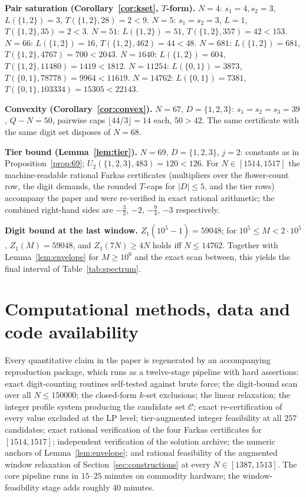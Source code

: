 \documentclass[11pt]{article}
\theoremstyle{definition}
\theoremstyle{remark}
\begin{document}
\medskip
\noindent\textbf{Pair saturation (Corollary~\ref{cor:kset}, $T$-form).} $N=4$: $s_1=4,s_2=3$, $L(\{1,2\})=3$, $T(\{1,2\},28)=2<9$. $N=5$: $s_1=s_2=3$, $L=1$, $T(\{1,2\},35)=2<3$. $N=51$: $L(\{1,2\})=51$, $T(\{1,2\},357)=42<153$. $N=66$: $L(\{1,2\})=16$, $T(\{1,2\},462)=44<48$. $N=681$: $L(\{1,2\})=681$, $T(\{1,2\},4767)=700<2043$. $N=1640$: $L(\{1,2\})=604$, $T(\{1,2\},11480)=1419<1812$. $N=11254$: $L(\{0,1\})=3873$, $T(\{0,1\},78778)=9964<11619$. $N=14762$: $L(\{0,1\})=7381$, $T(\{0,1\},103334)=15305<22143$.

\medskip
\noindent\textbf{Convexity (Corollary~\ref{cor:convex}).} $N=67$, $D=\{1,2,3\}$: $s_1=s_2=s_3=39$, $Q-N=50$, pairwise caps $\lfloor 44/3\rfloor=14$ each, $50>42$. The same certificate with the same digit set disposes of $N=68$.

\medskip
\noindent\textbf{Tier bound (Lemma~\ref{lem:tier}).} $N=69$, $D=\{1,2,3\}$, $j=2$: constants as in Proposition~\ref{prop:69}; $U_2(\{1,2,3\},483)=120<126$. For $N\in[1514,1517]$ the machine-readable rational Farkas certificates (multipliers over the flower-count row, the digit demands, the rounded $T$-caps for $|D|\le 5$, and the tier rows) accompany the paper and were re-verified in exact rational arithmetic; the combined right-hand sides are $-\tfrac{3}{2}$, $-2$, $-\tfrac{9}{4}$, $-3$ respectively.

\medskip
\noindent\textbf{Digit bound at the last window.} $Z_1(10^5-1)=59048$; for $10^5\le M<2\cdot 10^5$, $Z_1(M)=59048$, and $Z_1(7N)\ge 4N$ holds iff $N\le 14762$. Together with Lemma~\ref{lem:envelope} for $M\ge 10^6$ and the exact scan between, this yields the final interval of Table~\ref{tab:spectrum}.

\section{Computational methods, data and code availability}\label{app:supp}

Every quantitative claim in the paper is regenerated by an accompanying reproduction
package, which runs as a twelve-stage pipeline with hard assertions: exact digit-counting
routines self-tested against brute force; the digit-bound scan over all $N\le 150000$;
the closed-form $k$-set exclusions; the linear relaxation; the integer profile system
producing the candidate set $\mathcal{C}$; exact re-certification of every value excluded
at the LP level; tier-augmented integer feasibility at all $257$ candidates; exact rational verification of the four Farkas certificates for $[1514,1517]$; independent verification of the solution archive; the numeric anchors of Lemma~\ref{lem:envelope}; and rational feasibility of the augmented window relaxation of Section~\ref{sec:constructions} at every $N\in[1387,1513]$. The core pipeline runs in $15$--$25$ minutes on commodity hardware; the window-feasibility stage adds roughly $40$ minutes.
\end{document}
